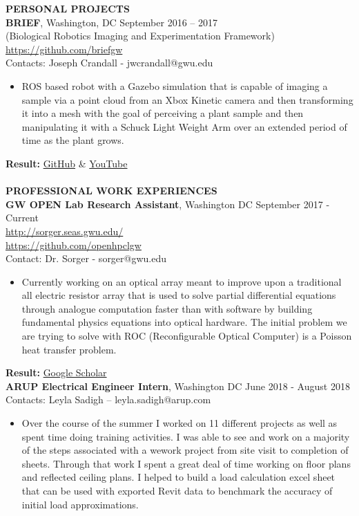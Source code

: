 \begin{singlespace}
\textbf{PERSONAL PROJECTS}\\
\textbf{BRIEF}, Washington, DC \hfill  September 2016 -- 2017\\     
(Biological Robotics Imaging and Experimentation Framework)\\
\url{https://github.com/briefgw}\\
Contacts: Joseph Crandall - jwcrandall@gwu.edu
\begin{itemize}
	\item ROS based robot with a Gazebo simulation that is capable of imaging a sample via a point cloud from an Xbox Kinetic camera  and then transforming it into a mesh with the goal of perceiving a plant sample and then manipulating it with a Schuck Light Weight Arm over an extended period of time as the plant grows.
\end{itemize}
\textbf{Result:} \href{https://github.com/briefgw}{GitHub} \& \href{https://www.youtube.com/watch?v=my1lXeC_J6s&t=189s}{YouTube}
\\\\
\textbf{PROFESSIONAL WORK EXPERIENCES}\\
\textbf{GW OPEN Lab Research Assistant}, Washington DC \hfill  September 2017 - Current\\
\url{http://sorger.seas.gwu.edu/}\\
\url{https://github.com/openhpclgw}\\
Contact: Dr. Sorger - sorger@gwu.edu
\begin{itemize}
	\item Currently working on an optical array meant to improve upon a traditional all electric resistor array that is used to solve partial differential equations through analogue computation faster than with software by building fundamental physics equations into optical hardware. The initial problem we are trying to solve with ROC (Reconfigurable Optical Computer) is a Poisson heat transfer problem.
\end{itemize}
\textbf{Result:} \href{https://scholar.google.com/citations?user=gUec2noAAAAJ\&hl=en}{Google Scholar}\\
\textbf{ARUP Electrical Engineer Intern}, Washington DC \hfill June 2018 - August 2018\\
Contacts: Leyla Sadigh – leyla.sadigh@arup.com
\begin{itemize}
	\item Over the course of the summer I worked on 11 different projects as well as spent time doing training activities. I was able to see and work on a majority of the steps associated with a wework project from site visit to completion of sheets. Through that work I spent a great deal of time working on floor plans and reflected ceiling plans. I helped to build a load calculation excel sheet that can be used with exported Revit data to benchmark the accuracy of initial load approximations. 

\end{itemize}
\end{singlespace}
